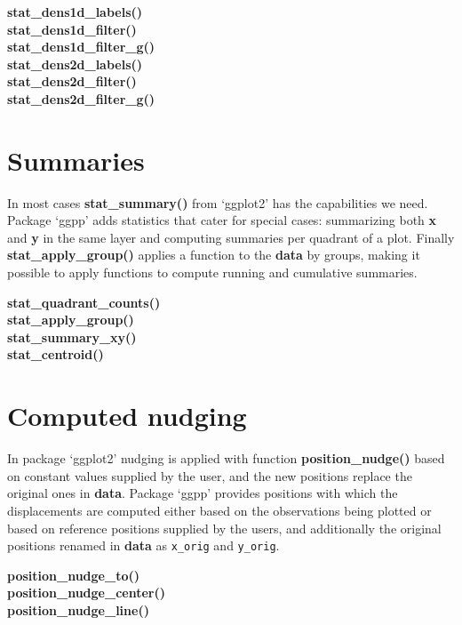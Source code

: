\documentclass[DIV=21,a3,landscape,9pt]{scrartcl}\usepackage[]{graphicx}\usepackage[]{xcolor}
\begin{document}
\begin{multicols}{3}
\noindent
\textbf{stat\_dens1d\_labels()}\\
\textbf{stat\_dens1d\_filter()}\\
\textbf{stat\_dens1d\_filter\_g()}\\
\textbf{stat\_dens2d\_labels()}\\
\textbf{stat\_dens2d\_filter()}\\
\textbf{stat\_dens2d\_filter\_g()}\\

\section*{Summaries}

In most cases \textbf{stat\_summary()} from `ggplot2' has the capabilities we need. Package `ggpp' adds statistics that cater for special cases: summarizing both \textbf{x} and \textbf{y} in the same layer and computing summaries per quadrant of a plot. Finally \textbf{stat\_apply\_group()} applies a function to the \textbf{data} by groups, making it possible to apply functions to compute running and cumulative summaries.\vspace{1ex}
 
\noindent
\textbf{stat\_quadrant\_counts()}\\
\textbf{stat\_apply\_group()}\\ 
\textbf{stat\_summary\_xy()}\\
\textbf{stat\_centroid()}
    
\section*{Computed nudging}

In package `ggplot2' nudging is applied with function \textbf{position\_nudge()} based on constant values supplied by the user, and the new positions replace the original ones in \textbf{data}. Package `ggpp' provides positions with which the displacements are computed either based on the observations being plotted or based on reference positions supplied by the users, and additionally the original positions renamed in \textbf{data} as \texttt{x\_orig} and \texttt{y\_orig}.\vspace{1ex}

\noindent
\textbf{position\_nudge\_to()}\\
\textbf{position\_nudge\_center()}\\
\textbf{position\_nudge\_line()}\\


\end{multicols}
\end{document}
